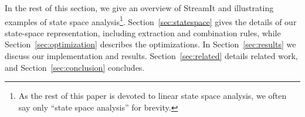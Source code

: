 In the rest of this section, we give an overview of StreamIt and
illustrating examples of state space analysis\footnote{As the rest of
this paper is devoted to linear state space analysis, we often say
only ``state space analysis'' for brevity.}.
Section~\ref{sec:statespace} gives the details of our state-space
representation, including extraction and combination rules, while
Section~\ref{sec:optimization} describes the optimizations.  In
Section~\ref{sec:results} we discuss our implementation and results.
Section~\ref{sec:related} details related work, and
Section~\ref{sec:conclusion} concludes.







